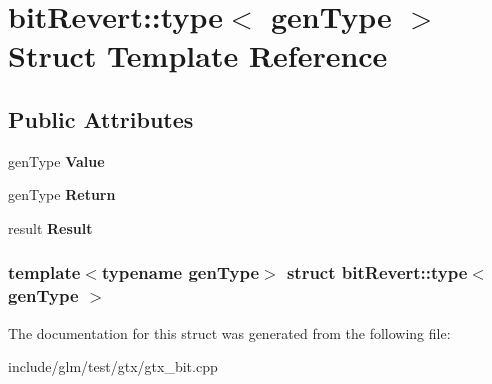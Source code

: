\hypertarget{structbitRevert_1_1type}{\section{bit\-Revert\-:\-:type$<$ gen\-Type $>$ \-Struct \-Template \-Reference}
\label{structbitRevert_1_1type}
}
\subsection*{\-Public \-Attributes}
\begin{DoxyCompactItemize}
\item 
\hypertarget{structbitRevert_1_1type_a80ba19f0b642116029b56f5f54e8bfa4}{gen\-Type {\bfseries \-Value}}\label{structbitRevert_1_1type_a80ba19f0b642116029b56f5f54e8bfa4}

\item 
\hypertarget{structbitRevert_1_1type_afac127d1d43edde7b9cbe74c86d21cf4}{gen\-Type {\bfseries \-Return}}\label{structbitRevert_1_1type_afac127d1d43edde7b9cbe74c86d21cf4}

\item 
\hypertarget{structbitRevert_1_1type_a0dbe74bcf37ed95ec150fd943b661cc4}{result {\bfseries \-Result}}\label{structbitRevert_1_1type_a0dbe74bcf37ed95ec150fd943b661cc4}

\end{DoxyCompactItemize}
\subsubsection*{template$<$typename gen\-Type$>$ struct bit\-Revert\-::type$<$ gen\-Type $>$}



\-The documentation for this struct was generated from the following file\-:\begin{DoxyCompactItemize}
\item 
include/glm/test/gtx/gtx\-\_\-bit.\-cpp\end{DoxyCompactItemize}
